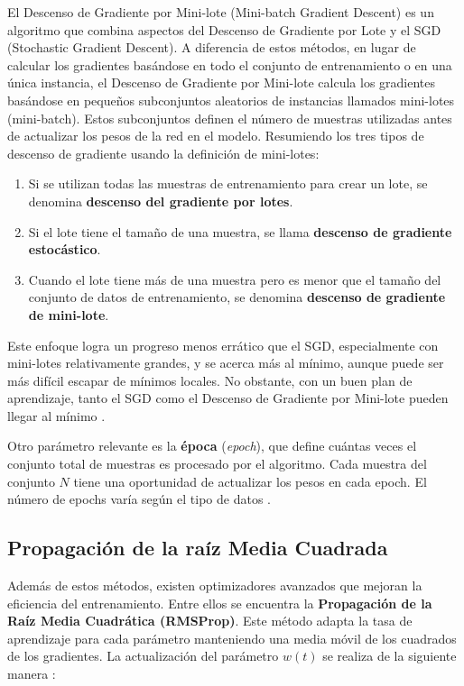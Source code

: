 El Descenso de Gradiente por Mini-lote (Mini-batch Gradient Descent) es un algoritmo que combina aspectos del Descenso de Gradiente por Lote y el SGD (Stochastic Gradient Descent). A diferencia de estos métodos, en lugar de calcular los gradientes basándose en todo el conjunto de entrenamiento o en una única instancia, el Descenso de Gradiente por Mini-lote calcula los gradientes basándose en pequeños subconjuntos aleatorios de instancias llamados mini-lotes (mini-batch). Estos subconjuntos definen el número de muestras utilizadas antes de actualizar los pesos de la red en el modelo. Resumiendo los tres tipos de descenso de gradiente usando la definición de mini-lotes:
\begin{enumerate}
\item Si se utilizan todas las muestras de entrenamiento para crear un lote, se denomina \textbf{descenso del gradiente por lotes}. 
\item Si el lote tiene el tamaño de una muestra, se llama \textbf{descenso de gradiente estocástico}. 
\item Cuando el lote tiene más de una muestra pero es menor que el tamaño del conjunto de datos de entrenamiento, se denomina \textbf{descenso de gradiente de mini-lote}. 
\end{enumerate}
Este enfoque logra un progreso menos errático que el SGD, especialmente con mini-lotes relativamente grandes, y se acerca más al mínimo, aunque puede ser más difícil escapar de mínimos locales. No obstante, con un buen plan de aprendizaje, tanto el SGD como el Descenso de Gradiente por Mini-lote pueden llegar al mínimo \citep{geron2022hands}.

Otro parámetro relevante es la \textbf{época} (\textit{epoch}), que define cuántas veces el conjunto total de muestras es procesado por el algoritmo. Cada muestra del conjunto \(N\) tiene una oportunidad de actualizar los pesos en cada epoch. El número de epochs varía según el tipo de datos \citep{pajares2021aprendizaje}.


\subsection{Propagación de la raíz Media Cuadrada}

Además de estos métodos, existen optimizadores avanzados que mejoran la eficiencia del entrenamiento. Entre ellos se encuentra la \textbf{Propagación de la Raíz Media Cuadrática (RMSProp)}. Este método adapta la tasa de aprendizaje para cada parámetro manteniendo una media móvil de los cuadrados de los gradientes. La actualización del parámetro \(w(t)\) se realiza de la siguiente manera \citep{pajares2021aprendizaje}:

